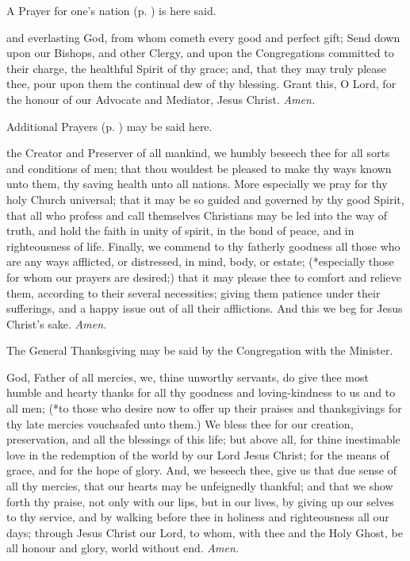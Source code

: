 \begin{rubric}
    A Prayer for one's nation (p. \pageref{prayers}) is here said.
\end{rubric}
\vspace{-2ex}
 and everlasting God, from whom cometh every good and perfect gift; Send down upon our Bishops, and other Clergy, and upon the Congregations committed to their charge, the healthful Spirit of thy grace; and, that they may truly please thee, pour upon them the continual dew of thy blessing. Grant this, O Lord, for the honour of our Advocate and Mediator, Jesus Christ. \textit{Amen.}
\begin{rubric}
    Additional Prayers (p. \pageref{prayers}) may be said here.
\end{rubric}
\vspace{-2ex}
 the Creator and Preserver of all mankind, we humbly beseech thee for all sorts and conditions of men; that thou wouldest be pleased to make thy ways known unto them, thy saving health unto all nations. More especially we pray for thy holy Church universal; that it may be so guided and governed by thy good Spirit, that all who profess and call themselves Christians may be led into the way of truth, and hold the faith in unity of spirit, in the bond of peace, and in righteousness of life. Finally, we commend to thy fatherly goodness all those who are any ways afflicted, or distressed, in mind, body, or estate; (*especially those for whom our prayers are desired;) that it may please thee to comfort and relieve them, according to their several necessities; giving them patience under their sufferings, and a happy issue out of all their afflictions. And this we beg for Jesus Christ's sake. \textit{Amen.}
\begin{rubric}
    The General Thanksgiving may be said by the Congregation with the Minister.
\end{rubric}
 God, Father of all mercies, we, thine unworthy servants, do give thee most humble and hearty thanks for all thy goodness and loving-kindness to us and to all men; (*to those who desire now to offer up their praises and thanksgivings for thy late mercies vouchsafed unto them.) We bless thee for our creation, preservation, and all the blessings of this life; but above all, for thine inestimable love in the redemption of the world by our Lord Jesus Christ; for the means of grace, and for the hope of glory. And, we beseech thee, give us that due sense of all thy mercies, that our hearts may be unfeignedly thankful; and that we show forth thy praise, not only with our lips, but in our lives, by giving up our selves to thy service, and by walking before thee in holiness and righteousness all our days; through Jesus Christ our Lord, to whom, with thee and the Holy Ghost, be all honour and glory, world without end. \textit{Amen.}
